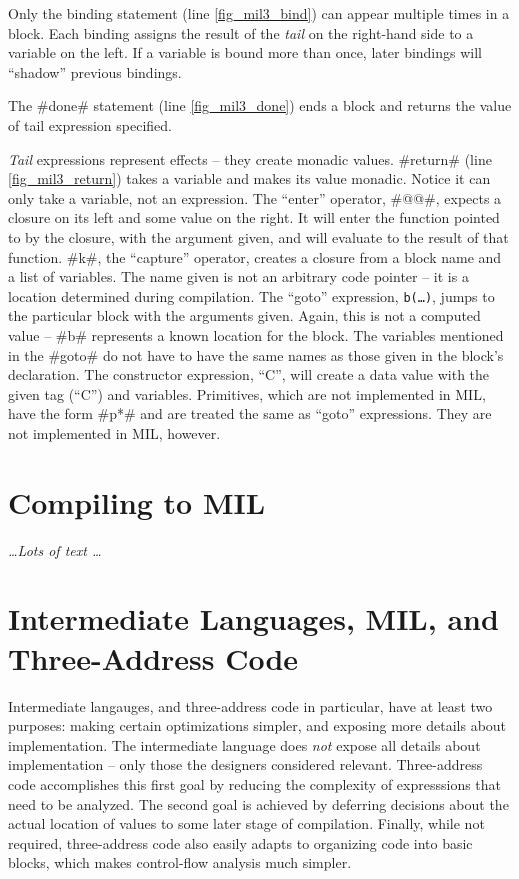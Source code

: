 \documentclass[12pt]{report}
\begin{document}
Only the binding statement (line \ref{fig_mil3_bind}) can appear multiple
times in a block. Each binding assigns the result of the \emph{tail}
on the right-hand side to a variable on the left. If a variable is
bound more than once, later bindings will ``shadow'' previous
bindings.

The #done# statement (line \ref{fig_mil3_done}) ends a block and returns
the value of tail expression specified.

\emph{Tail} expressions represent effects -- they create monadic
values. #return# (line \ref{fig_mil3_return}) takes a variable and
makes its value monadic. Notice it can only take a variable, not an
expression.  The ``enter'' operator, #@@#, expects a closure on its
left and some value on the right. It will enter the function pointed
to by the closure, with the argument given, and will evaluate to the
result of that function. #k#, the ``capture'' operator, creates a
closure from a block name and a list of variables. The name given is
not an arbitrary code pointer -- it is a location determined during
compilation. The ``goto'' expression, \texttt{b(\dots)}, jumps to the
particular block with the arguments given. Again, this is not a
computed value -- #b# represents a known location for the block. The
variables mentioned in the #goto# do not have to have the same names
as those given in the block's declaration. The constructor expression,
``C'', will create a data value with the given tag (``C'') and
variables. Primitives, which are not implemented in MIL, have the form
#p*# and are treated the same as ``goto'' expressions. They are not 
implemented in MIL, however. 

\section{Compiling \lamA to MIL}

\emph{\dots Lots of text \dots}

\section{Intermediate Languages, MIL, and Three-Address Code}

Intermediate langauges, and three-address code in particular, have at
least two purposes: making certain optimizations simpler, and exposing
more details about implementation. The intermediate language does
\emph{not} expose all details about implementation -- only those the
designers considered relevant. Three-address code accomplishes this
first goal by reducing the complexity of expresssions that need to be
analyzed. The second goal is achieved by deferring decisions about the
actual location of values to some later stage of compilation.
Finally, while not required, three-address code also easily adapts to
organizing code into basic blocks, which makes control-flow analysis
much simpler.
\end{document}
